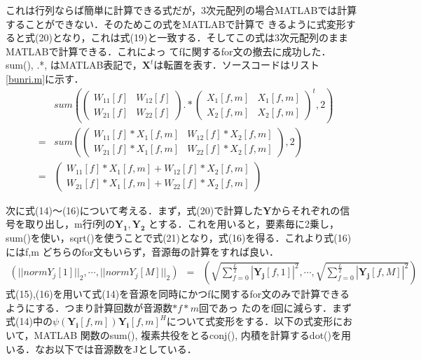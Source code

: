 \documentclass[a4j]{jarticle}
\begin{document}
これは行列ならば簡単に計算できる式だが，3次元配列の場合MATLABでは計算することができない．そのためこの式をMATLABで計算で
きるように式変形すると式(20)となり，これは式(19)と一致する．そしてこの式は3次元配列のままMATLABで計算できる．これによっ
てfに関するfor文の撤去に成功した．sum(), .*, はMATLAB表記で，$\bm{X}^t$は転置を表す．ソースコードはリスト\ref{bunri.m}に示す．
\begin{eqnarray}
&& sum \left(
\left(
 \begin{array}{ccc}
  W_{11}[f] & W_{12}[f]\\
  W_{21}[f] & W_{22}[f]
 \end{array}
\right) 
.*
\left(
 \begin{array}{ccc}
  X_1[f,m] & X_1[f,m]\\
  X_2[f,m] & X_2[f,m]
 \end{array}
\right)^t
, 2\right) \\
&=& 
sum \left(
\left(
 \begin{array}{ccc}
  W_{11}[f] * X_1[f,m] & W_{12}[f] * X_2[f,m]\\
  W_{21}[f] * X_1[f,m] & W_{22}[f] * X_2[f,m]
 \end{array}
\right) 
, 2\right) \nonumber \\
&=& 
\left(
 \begin{array}{ccc}
  W_{11}[f] * X_1[f,m] + W_{12}[f] * X_2[f,m]\\
  W_{21}[f] * X_1[f,m] + W_{22}[f] * X_2[f,m]
 \end{array}
\right) \nonumber
\end{eqnarray}

次に式(14)〜(16)について考える．まず，式(20)で計算した$\bm{Y}$からそれぞれの信号を取り出し，m行f列の$\bm{Y_1}, \bm{Y_2}$
とする．これを用いると，要素毎に2乗し，sum()を使い，sqrt()を使うことで式(21)となり，式(16)を得る．これより式(16)にはf,m
どちらのfor文もいらず，音源毎の計算をすれば良い．
 \begin{eqnarray}
\left(||normY_j[1]||_2, \cdots , ||normY_j[M]||_2 \right) &=& \left(\sqrt{\sum_{f=0}^{\frac{L}{2}}
 |\bm{Y_j}[f,1]|^2}, \cdots , \sqrt{\sum_{f=0}^{\frac{L}{2}} |\bm{Y_j}[f,M]|^2} \right)  
 \end{eqnarray}
式(15),(16)を用いて式(14)を音源を同時にかつfに関するfor文のみで計算できるようにする．つまり計算回数が音源数$*f*m$回であっ
たのをf回に減らす．まず式(14)中の$\psi (\bm{Y_i}[f,m])\bm{Y_i}[f,m]^H$について式変形をする．以下の式変形において，MATLAB
関数のsum(), 複素共役をとるconj(), 内積を計算するdot()を用いる．なお以下では音源数をJとしている．
\end{document}
